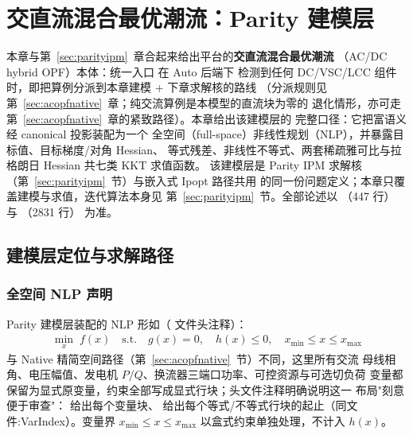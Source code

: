 \section{交直流混合最优潮流：Parity 建模层}\label{sec:parityform}

本章与第~\ref{sec:parityipm}~章合起来给出平台的\textbf{交直流混合最优潮流}
（AC/DC hybrid OPF）本体：统一入口  在 Auto 后端下
检测到任何 DC/VSC/LCC 组件时，即把算例分派到本章建模 + 下章求解核的路线
（分派规则见第~\ref{sec:acopfnative}~章；纯交流算例是本模型的直流块为零的
退化情形，亦可走第~\ref{sec:acopfnative}~章的紧致路径）。本章给出该建模层的
完整口径：它把富语义  经 canonical 投影装配为一个
全空间（full-space）非线性规划（NLP），并暴露目标值、目标梯度/对角 Hessian、
等式残差、非线性不等式、两套稀疏雅可比与拉格朗日 Hessian 共七类 KKT 求值函数。
该建模层是 Parity IPM 求解核（第~\ref{sec:parityipm}~节）与嵌入式 Ipopt 路径共用
的同一份问题定义；本章只覆盖建模与求值，迭代算法本身见
第~\ref{sec:parityipm}~节。全部论述以
（447 行）
与 （2831 行）
为准。

\subsection{建模层定位与求解路径}

\subsubsection*{全空间 NLP 声明}
Parity 建模层装配的 NLP 形如（
 文件头注释）：
\begin{align*}
\min_{x}\; f(x)\quad
\text{s.t.}\quad g(x)=0,\quad h(x)\le 0,\quad
x_{\min}\le x\le x_{\max}
\end{align*}
与 Native 精简空间路径（第~\ref{sec:acopfnative}~节）不同，这里所有交流
母线相角、电压幅值、发电机 $P/Q$、换流器三端口功率、可控资源与可选切负荷
变量都保留为显式原变量，约束全部写成显式行块；头文件注释明确说明这一
布局"刻意便于审查"： 给出每个变量块、
给出每个等式/不等式行块的起止（同文件:VarIndex）。变量界
$x_{\min}\le x\le x_{\max}$ 以盒式约束单独处理，不计入 $h(x)$。

